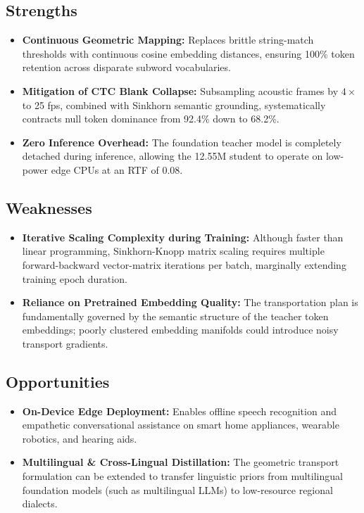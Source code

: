 \subsection{Strengths}
\begin{itemize}
    \item \textbf{Continuous Geometric Mapping:} Replaces brittle string-match thresholds with continuous cosine embedding distances, ensuring 100\% token retention across disparate subword vocabularies.
    \item \textbf{Mitigation of CTC Blank Collapse:} Subsampling acoustic frames by $4\times$ to 25 fps, combined with Sinkhorn semantic grounding, systematically contracts null token dominance from 92.4\% down to 68.2\%.
    \item \textbf{Zero Inference Overhead:} The foundation teacher model is completely detached during inference, allowing the 12.55M student to operate on low-power edge CPUs at an RTF of 0.08.
\end{itemize}

\subsection{Weaknesses}
\begin{itemize}
    \item \textbf{Iterative Scaling Complexity during Training:} Although faster than linear programming, Sinkhorn-Knopp matrix scaling requires multiple forward-backward vector-matrix iterations per batch, marginally extending training epoch duration.
    \item \textbf{Reliance on Pretrained Embedding Quality:} The transportation plan is fundamentally governed by the semantic structure of the teacher token embeddings; poorly clustered embedding manifolds could introduce noisy transport gradients.
\end{itemize}

\subsection{Opportunities}
\begin{itemize}
    \item \textbf{On-Device Edge Deployment:} Enables offline speech recognition and empathetic conversational assistance on smart home appliances, wearable robotics, and hearing aids.
    \item \textbf{Multilingual & Cross-Lingual Distillation:} The geometric transport formulation can be extended to transfer linguistic priors from multilingual foundation models (such as multilingual LLMs) to low-resource regional dialects.
\end{itemize}

